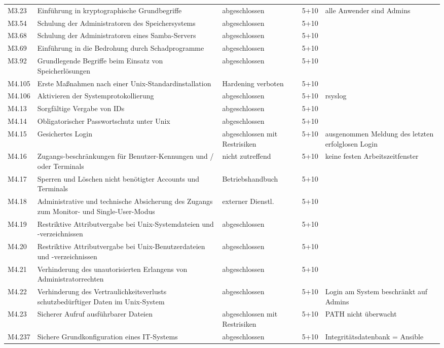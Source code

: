 \begin{longtable}{lp{3.7cm}|p{3cm}l|p{3.8cm}}
M3.23 & Einführung in kryptographische Grundbegriffe & abgeschlossen & 5+10 & alle Anwender sind Admins \\
M3.54 & Schulung der Administratoren des Speichersystems & abgeschlossen & 5+10 &  \\
M3.68 & Schulung der Administratoren eines Samba-Servers & abgeschlossen & 5+10 &  \\
M3.69 & Einführung in die Bedrohung durch Schadprogramme & abgeschlossen & 5+10 &  \\
M3.92 & Grundlegende Begriffe beim Einsatz von Speicherlösungen & abgeschlossen & 5+10 &  \\
M4.105 & Erste Maßnahmen nach einer Unix-Standardinstallation & Hardening verboten & 5+10 &  \\
M4.106 & Aktivieren der Systemprotokollierung & abgeschlossen & 5+10 & rsyslog \\
M4.13 & Sorgfältige Vergabe von IDs & abgeschlossen & 5+10 &  \\
M4.14 & Obligatorischer Passwortschutz unter Unix & abgeschlossen & 5+10 &  \\
M4.15 & Gesichertes Login & abgeschlossen mit Restrisiken & 5+10 & ausgenommen Meldung des letzten erfolglosen Login \\
M4.16 & Zugangs-beschränkungen für Benutzer-Kennungen und / oder Terminals & nicht zutreffend & 5+10 & keine festen Arbeitszeitfenster \\
M4.17 & Sperren und Löschen nicht benötigter Accounts und Terminals & Betriebshandbuch & 5+10 &  \\
M4.18 & Administrative und technische Absicherung des Zugangs zum Monitor- und Single-User-Modus & externer Dienstl. & 5+10 &  \\
M4.19 & Restriktive Attributvergabe bei Unix-Systemdateien und -verzeichnissen & abgeschlossen & 5+10 &  \\
M4.20 & Restriktive Attributvergabe bei Unix-Benutzerdateien und -verzeichnissen & abgeschlossen & 5+10 &  \\
M4.21 & Verhinderung des unautorisierten Erlangens von Administratorrechten & abgeschlossen & 5+10 &  \\
M4.22 & Verhinderung des Vertraulichkeitsverlusts schutzbedürftiger Daten im Unix-System & abgeschlossen & 5+10 & Login am System beschränkt auf Admins \\
M4.23 & Sicherer Aufruf ausführbarer Dateien & abgeschlossen mit Restrisiken & 5+10 & PATH nicht überwacht \\
M4.237 & Sichere Grundkonfiguration eines IT-Systems & abgeschlossen & 5+10 & Integritätsdatenbank = Ansible \\

\end{longtable}
